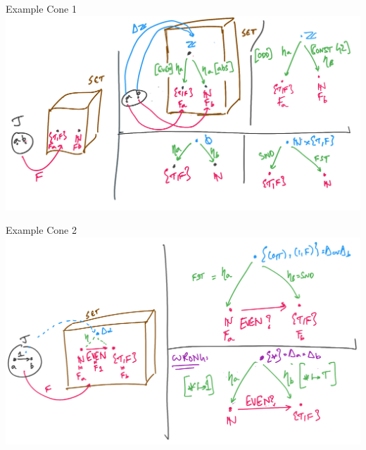 \documentclass[8pt]{beamer}
\begin{document}
\begin{frame}{Example Cone 1}
    \includegraphics[width=\textwidth]{./cones-over-discrete.png}
\end{frame}

\begin{frame}{Example Cone 2}
    \includegraphics[width=\textwidth]{./cones-over-single-arrow.png}
\end{frame}
\end{document}
